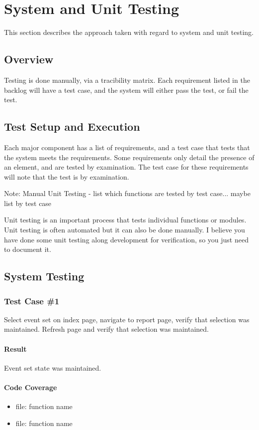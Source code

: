 

\chapter{System  and Unit Testing}

This section describes the approach taken with regard to system and unit testing. 

\section{Overview}
Testing is done manually, via a tracibility matrix. Each requirement listed in the backlog will have a test case, and the system will either pass the test, or fail the test. 

\section{Test Setup and Execution}
Each major component has a list of requirements, and a test case that tests that the system meets the requirements. Some requirements only detail the presence of an element, and are tested by examination. The test case for these requirements will note that the test is by examination. 

Note: Manual Unit Testing - list which functions are tested by test case... maybe list by test case

Unit testing is an important process that tests individual functions or modules. Unit testing is often automated but it can also be done manually. I believe you have done some unit testing along development for verification, so you just need to document it.

\section{System Testing}

\subsection{Test Case \#1}
Select event set on index page, navigate to report page, verify that selection was maintained. Refresh page and verify that selection was maintained.
\subsubsection{Result}
Event set state was maintained.
\subsubsection{Code Coverage}
\begin{itemize}
\item file: function name
\item file: function name
\end{itemize}
